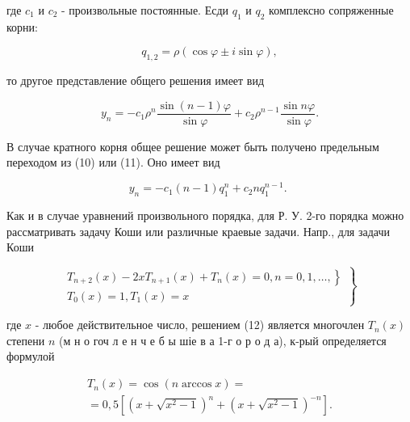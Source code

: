 \documentclass[10pt]{article}
\begin{document}
где $c_{1}$ и $c_{2}$ - произвольные постоянные. Есди $q_{1}$ и $q_{2}$ комплексно сопряженные корни:



\[

q_{1,2}=\rho(\cos \varphi \pm i \sin \varphi),

\]



то другое представление общего решения имеет вид



\[

y_{n}=-c_{1} \rho^{n} \frac{\sin (n-1) \varphi}{\sin \varphi}+c_{2} \rho^{n-1} \frac{\sin n \varphi}{\sin \varphi} .

\]



В случае кратного корня общее решение может быть получено предельным переходом из (10) или (11). Оно имеет вид



\[

y_{n}=-c_{1}(n-1) q_{1}^{n}+c_{2} n q_{1}^{n-1} \text {. }

\]



Как и в случае уравнений произвольного порядка, для Р. У. 2-го порядка можно рассматривать задачу Коши или различные краевые задачи. Напр., для задачи Коши



\[

\left.\begin{array}{c}

\left.T_{n+2}(x)-2 x T_{n+1}(x)+T_{n}(x)=0, n=0,1, \ldots,\right\} \\

T_{0}(x)=1, T_{1}(x)=x

\end{array}\right\}

\]



где $x$ - любое действительное число, решением (12) является многочлен $T_{n}(x)$ степени $n$ (м н о гоч л е н ч е б ы шіе в а 1-г о р о д а), к-рый определяется формулой



\[

\begin{gathered}

T_{n}(x)=\cos (n \arccos x)= \\

=0,5\left[\left(x+\sqrt{x^{2}-1}\right)^{n}+\left(x+\sqrt{x^{2}-1}\right)^{-n}\right] .

\end{gathered}

\]
\end{document}
